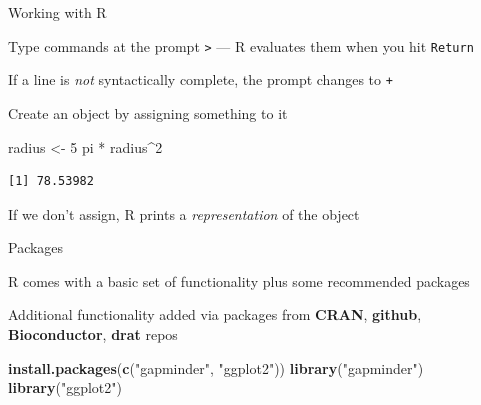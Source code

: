 \documentclass[10pt,ignorenonframetext,compress, aspectratio=169]{beamer}
\newenvironment{Shaded}{\begin{snugshade}}{\end{snugshade}}
\newcommand{\KeywordTok}[1]{\textcolor[rgb]{0.13,0.29,0.53}{\textbf{{#1}}}}
\newcommand{\DecValTok}[1]{\textcolor[rgb]{0.00,0.00,0.81}{{#1}}}
\newcommand{\StringTok}[1]{\textcolor[rgb]{0.31,0.60,0.02}{{#1}}}
\newcommand{\NormalTok}[1]{{#1}}
\begin{document}
\begin{frame}[fragile]{Working with R}

Type commands at the prompt \texttt{\textgreater{}} --- R evaluates them
when you hit \texttt{Return}

If a line is \emph{not} syntactically complete, the prompt changes to
\texttt{+}

Create an object by assigning something to it

\scriptsize

\begin{Shaded}
\begin{Highlighting}[]
\NormalTok{radius <-}\StringTok{ }\DecValTok{5}
\NormalTok{pi *}\StringTok{ }\NormalTok{radius^}\DecValTok{2}
\end{Highlighting}
\end{Shaded}

\begin{verbatim}
[1] 78.53982
\end{verbatim}

\normalsize

If we don't assign, R prints a \emph{representation} of the object

\end{frame}

\begin{frame}[fragile]{Packages}

R comes with a basic set of functionality plus some \alert{recommended}
packages

Additional functionality added via \alert{packages} from \textbf{CRAN},
\textbf{github}, \textbf{Bioconductor}, \textbf{drat} repos

\scriptsize

\begin{Shaded}
\begin{Highlighting}[]
\KeywordTok{install.packages}\NormalTok{(}\KeywordTok{c}\NormalTok{(}\StringTok{"gapminder"}\NormalTok{, }\StringTok{"ggplot2"}\NormalTok{))}
\KeywordTok{library}\NormalTok{(}\StringTok{"gapminder"}\NormalTok{)}
\KeywordTok{library}\NormalTok{(}\StringTok{"ggplot2"}\NormalTok{)}
\end{Highlighting}
\end{Shaded}

\normalsize

\end{frame}
\end{document}
